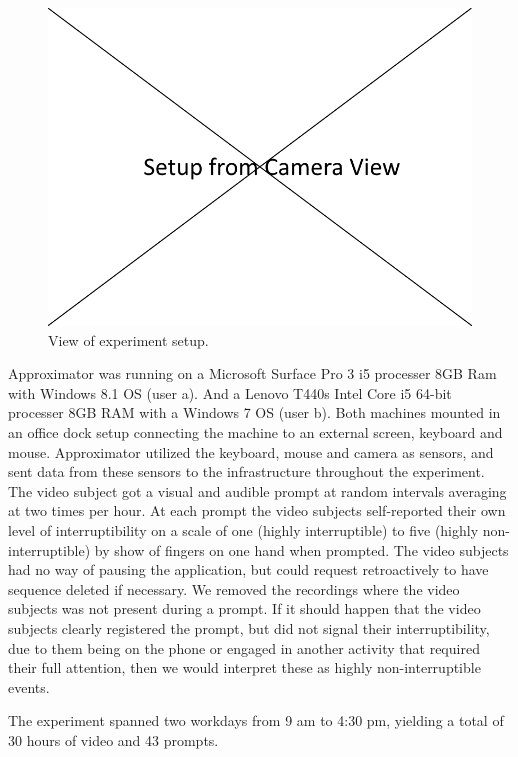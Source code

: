 \documentclass{sigchi}
\begin{document}
\begin{figure}
  \centering
  \includegraphics[width=\columnwidth]{figures/experiment_setup.png}
  \caption{View of experiment setup.}
  \label{fig:experiment}
\end{figure}

Approximator was running on a Microsoft Surface Pro 3 i5 processer 8GB Ram with Windows 8.1 OS (user a).
And a Lenovo T440s Intel Core i5 64-bit processer 8GB RAM with a Windows 7 OS (user b).
Both machines mounted in an office dock setup connecting the machine to an external screen, keyboard and mouse.
Approximator utilized the keyboard, mouse and camera as sensors, and sent data from these sensors to the infrastructure throughout the experiment.
The video subject got a visual and audible prompt at random intervals averaging at two times per hour.
At each prompt the video subjects self-reported their own level of interruptibility on a scale of one (highly interruptible) to five (highly non-interruptible) by show of fingers on one hand when prompted.
The video subjects had no way of pausing the application, but could request retroactively to have sequence deleted if necessary.
We removed the recordings where the video subjects was not present during a prompt.
If it should happen that the video subjects clearly registered the prompt, but did not signal their interruptibility, due to them being on the phone or engaged in another activity that required their full attention, then we would interpret these as highly non-interruptible events.

The experiment spanned two workdays from 9 am to 4:30 pm, yielding a total of 30 hours of video and 43 prompts.
\end{document}
